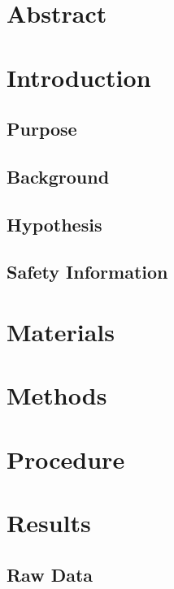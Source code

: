 \documentclass{article}
\begin{document}

\section*{Abstract}

\section*{Introduction} %

\subsection*{Purpose} %

\subsection*{Background}%

\subsection*{Hypothesis}%

\subsection*{Safety Information}%

\section*{Materials} %

\section*{Methods}%

\section*{Procedure} %

\section*{Results} %
\subsection*{Raw Data} %
\end{document}
